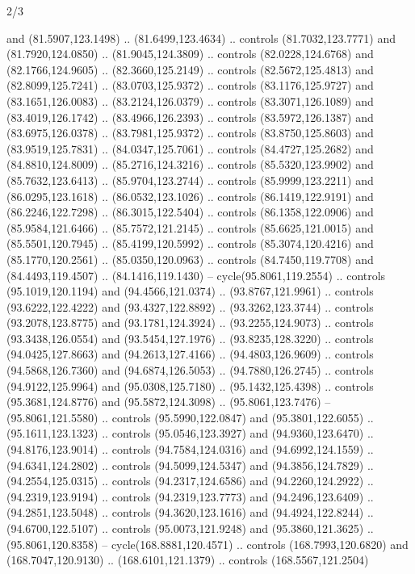 \begin{flagdescription}{2/3}
\begin{scope}[shift={(0.5\flaglength,0.5)},scale=\flagwidth/320]
\begin{scope}[y=0.8pt, x=0.8pt, yscale=-1,shift={(-118.3,-146)}]
  and (81.5907,123.1498) .. (81.6499,123.4634) .. controls (81.7032,123.7771)
  and (81.7920,124.0850) .. (81.9045,124.3809) .. controls (82.0228,124.6768)
  and (82.1766,124.9605) .. (82.3660,125.2149) .. controls (82.5672,125.4813)
  and (82.8099,125.7241) .. (83.0703,125.9372) .. controls (83.1176,125.9727)
  and (83.1651,126.0083) .. (83.2124,126.0379) .. controls (83.3071,126.1089)
  and (83.4019,126.1742) .. (83.4966,126.2393) .. controls (83.5972,126.1387)
  and (83.6975,126.0378) .. (83.7981,125.9372) .. controls (83.8750,125.8603)
  and (83.9519,125.7831) .. (84.0347,125.7061) .. controls (84.4727,125.2682)
  and (84.8810,124.8009) .. (85.2716,124.3216) .. controls (85.5320,123.9902)
  and (85.7632,123.6413) .. (85.9704,123.2744) .. controls (85.9999,123.2211)
  and (86.0295,123.1618) .. (86.0532,123.1026) .. controls (86.1419,122.9191)
  and (86.2246,122.7298) .. (86.3015,122.5404) .. controls (86.1358,122.0906)
  and (85.9584,121.6466) .. (85.7572,121.2145) .. controls (85.6625,121.0015)
  and (85.5501,120.7945) .. (85.4199,120.5992) .. controls (85.3074,120.4216)
  and (85.1770,120.2561) .. (85.0350,120.0963) .. controls (84.7450,119.7708)
  and (84.4493,119.4507) .. (84.1416,119.1430) -- cycle(95.8061,119.2554) ..
  controls (95.1019,120.1194) and (94.4566,121.0374) .. (93.8767,121.9961) ..
  controls (93.6222,122.4222) and (93.4327,122.8892) .. (93.3262,123.3744) ..
  controls (93.2078,123.8775) and (93.1781,124.3924) .. (93.2255,124.9073) ..
  controls (93.3438,126.0554) and (93.5454,127.1976) .. (93.8235,128.3220) ..
  controls (94.0425,127.8663) and (94.2613,127.4166) .. (94.4803,126.9609) ..
  controls (94.5868,126.7360) and (94.6874,126.5053) .. (94.7880,126.2745) ..
  controls (94.9122,125.9964) and (95.0308,125.7180) .. (95.1432,125.4398) ..
  controls (95.3681,124.8776) and (95.5872,124.3098) .. (95.8061,123.7476) --
  (95.8061,121.5580) .. controls (95.5990,122.0847) and (95.3801,122.6055) ..
  (95.1611,123.1323) .. controls (95.0546,123.3927) and (94.9360,123.6470) ..
  (94.8176,123.9014) .. controls (94.7584,124.0316) and (94.6992,124.1559) ..
  (94.6341,124.2802) .. controls (94.5099,124.5347) and (94.3856,124.7829) ..
  (94.2554,125.0315) .. controls (94.2317,124.6586) and (94.2260,124.2922) ..
  (94.2319,123.9194) .. controls (94.2319,123.7773) and (94.2496,123.6409) ..
  (94.2851,123.5048) .. controls (94.3620,123.1616) and (94.4924,122.8244) ..
  (94.6700,122.5107) .. controls (95.0073,121.9248) and (95.3860,121.3625) ..
  (95.8061,120.8358) -- cycle(168.8881,120.4571) .. controls (168.7993,120.6820)
  and (168.7047,120.9130) .. (168.6101,121.1379) .. controls (168.5567,121.2504)

\end{scope}
\end{scope}
\end{flagdescription}
